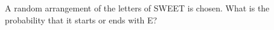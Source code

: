 A random arrangement of the letters of SWEET is chosen. What is the probability that it starts or ends with E?
